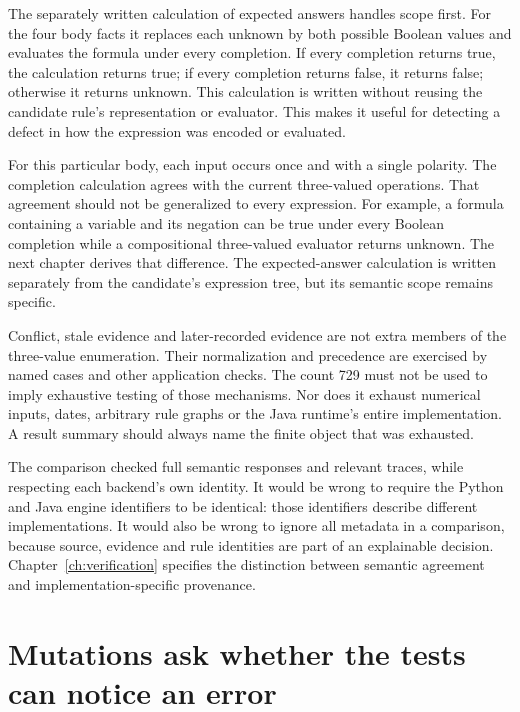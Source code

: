 The separately written calculation of expected answers handles scope first. For the four body facts it
replaces each unknown by both possible Boolean values and evaluates the formula
under every completion. If every completion returns true, the calculation returns
true; if every completion returns false, it returns false; otherwise it returns
unknown. This calculation is written without reusing the candidate rule's
representation or evaluator. This makes
it useful for detecting a defect in how the expression was encoded or evaluated.


For this particular body, each input occurs once and with a single polarity.
The completion calculation agrees with the current three-valued operations.
That agreement should not be generalized to every expression. For example, a
formula containing a variable and its negation can be true under every Boolean
completion while a compositional three-valued evaluator returns unknown. The
next chapter derives that difference. The expected-answer calculation is written separately
from the candidate's expression tree, but its semantic scope remains specific.

Conflict, stale evidence and later-recorded evidence are not extra members of
the three-value enumeration. Their normalization and precedence are exercised
by named cases and other application checks. The count 729 must not be used to
imply exhaustive testing of those mechanisms. Nor does it exhaust numerical
inputs, dates, arbitrary rule graphs or the Java runtime's entire implementation.
A result summary should always name the finite object that was exhausted.

The comparison checked full semantic responses and relevant traces, while
respecting each backend's own identity. It would be wrong to require the Python
and Java engine identifiers to be identical: those identifiers describe
different implementations. It would also be wrong to ignore all metadata in a
comparison, because source, evidence and rule identities are part of an
explainable decision. Chapter~\ref{ch:verification} specifies the distinction
between semantic agreement and implementation-specific provenance.

\section{Mutations ask whether the tests can notice an error}
\label{merge:M02:05}

